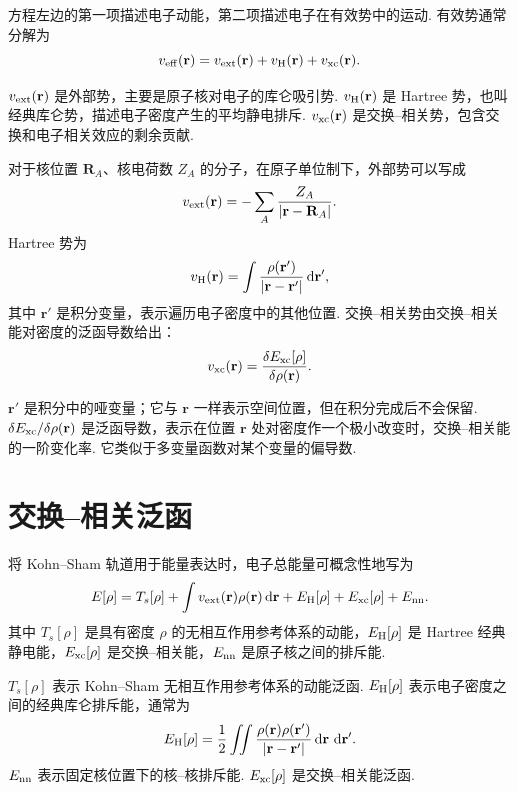 \documentclass[UTF8,11pt,a4paper,openany]{ctexbook}
\newcommand{\dd}{\,\mathrm d}\newcommand{\Ham}{\hat H}\newcommand{\tr}{\operatorname{Tr}}
\begin{document}
方程左边的第一项描述电子动能，第二项描述电子在有效势中的运动. 有效势通常分解为
\[
v_{\rm eff}(\mathbf r)
=
v_{\rm ext}(\mathbf r)
+
v_{\rm H}(\mathbf r)
+
v_{\rm xc}(\mathbf r).
\]

\begin{notationbox}
$v_{\rm ext}(\mathbf r)$ 是外部势，主要是原子核对电子的库仑吸引势. $v_{\rm H}(\mathbf r)$ 是 Hartree 势，也叫经典库仑势，描述电子密度产生的平均静电排斥. $v_{\rm xc}(\mathbf r)$ 是交换--相关势，包含交换和电子相关效应的剩余贡献. 
\end{notationbox}

对于核位置 $\mathbf R_A$、核电荷数 $Z_A$ 的分子，在原子单位制下，外部势可以写成
\[
v_{\rm ext}(\mathbf r)
=
-\sum_A\frac{Z_A}{|\mathbf r-\mathbf R_A|}.
\]
Hartree 势为
\[
v_{\rm H}(\mathbf r)
=
\int
\frac{\rho(\mathbf r')}{|\mathbf r-\mathbf r'|}
\dd\mathbf r',
\]
其中 $\mathbf r'$ 是积分变量，表示遍历电子密度中的其他位置. 交换--相关势由交换--相关能对密度的泛函导数给出：
\[
v_{\rm xc}(\mathbf r)
=
\frac{\delta E_{\rm xc}[\rho]}{\delta\rho(\mathbf r)}.
\]

\begin{notationbox}
$\mathbf r'$ 是积分中的哑变量；它与 $\mathbf r$ 一样表示空间位置，但在积分完成后不会保留. $\delta E_{\rm xc}/\delta\rho(\mathbf r)$ 是泛函导数，表示在位置 $\mathbf r$ 处对密度作一个极小改变时，交换--相关能的一阶变化率. 它类似于多变量函数对某个变量的偏导数. 
\end{notationbox}

\section{交换--相关泛函}

将 Kohn--Sham 轨道用于能量表达时，电子总能量可概念性地写为
\[
E[\rho]
=
T_s[\rho]
+
\int v_{\rm ext}(\mathbf r)\rho(\mathbf r)\dd\mathbf r
+
E_{\rm H}[\rho]
+
E_{\rm xc}[\rho]
+
E_{\rm nn}.
\]
其中 $T_s[\rho]$ 是具有密度 $\rho$ 的无相互作用参考体系的动能，$E_{\rm H}[\rho]$ 是 Hartree 经典静电能，$E_{\rm xc}[\rho]$ 是交换--相关能，$E_{\rm nn}$ 是原子核之间的排斥能. 

\begin{notationbox}
$T_s[\rho]$ 表示 Kohn--Sham 无相互作用参考体系的动能泛函. $E_{\rm H}[\rho]$ 表示电子密度之间的经典库仑排斥能，通常为
\[
E_{\rm H}[\rho]
=
\frac12\iint
\frac{\rho(\mathbf r)\rho(\mathbf r')}
{|\mathbf r-\mathbf r'|}
\dd\mathbf r\,\dd\mathbf r'.
\]
$E_{\rm nn}$ 表示固定核位置下的核--核排斥能. $E_{\rm xc}[\rho]$ 是交换--相关能泛函. 
\end{notationbox}
\end{document}
